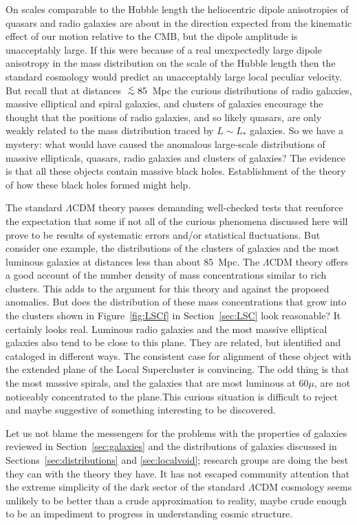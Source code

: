 \documentclass[fleqn,12pt]{article}
\def\lap{\lower.5ex\hbox{$\; \buildrel < \over \sim \;$}}
\begin{document}
On scales comparable to the Hubble length the heliocentric dipole anisotropies of quasars and radio galaxies are about in the direction expected from the kinematic effect of our motion relative to the CMB, but the dipole amplitude is unacceptably large. If this were because of a real unexpectedly large dipole anisotropy in the mass distribution on the scale of the Hubble length then the standard cosmology would predict an unacceptably large local peculiar velocity. But recall that at distances $\lap 85$~Mpc the curious distributions of radio galaxies, massive elliptical and spiral galaxies, and clusters of galaxies encourage the thought that the positions of radio galaxies, and so likely quasars, are only weakly related to the mass distribution traced by $L\sim L_\ast$ galaxies. So we have a mystery: what would have caused the anomalous large-scale distributions of massive ellipticals, quasars, radio galaxies and clusters of galaxies? The evidence is that all these objects contain massive black holes. Establishment of the theory of how these black holes formed might help. 

The standard $\Lambda$CDM theory passes demanding well-checked tests that reenforce the expectation that some if not all of the curious phenomena discussed here will prove to be results of systematic errors and/or statistical fluctuations. But consider one example, the distributions of the clusters of galaxies and the most luminous galaxies at distances less than about 85~Mpc. The $\Lambda$CDM theory offers a good account of the number density of mass concentrations similar to rich clusters. This adds to the argument for this theory and against the proposed anomalies. But does the distribution of these mass concentrations that grow into the clusters shown in  Figure~\ref{fig:LSCf} in Section~\ref{sec:LSC} look reasonable? It certainly looks real. Luminous radio galaxies and the most massive elliptical galaxies also tend to be close to this plane. They are related, but identified  and cataloged in different ways. The consistent case for alignment of these object with the extended plane of the Local Supercluster is convincing. The odd thing is that the most massive spirals, and the galaxies that are most luminous at $60\mu$, are not noticeably concentrated to the plane.This curious situation is difficult to reject and maybe suggestive of something interesting to be discovered.

 Let us not blame the messengers for the problems with the properties of galaxies reviewed in Section~\ref{sec:galaxies} and the distributions of galaxies discussed in Sections~\ref{sec:distributions} and \ref{sec:localvoid}; research groups are doing the best they can with the theory they have. It has not escaped community attention that the extreme simplicity of the dark sector of the standard $\Lambda$CDM cosmology seems unlikely to be better than a crude approximation to reality, maybe crude enough to be an impediment to progress in understanding cosmic structure.
 
\end{document}
